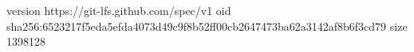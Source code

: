 version https://git-lfs.github.com/spec/v1
oid sha256:6523217f5eda5efda4073d49c9f8b52ff00cb2647473ba62a3142af8b6f3cd79
size 1398128
